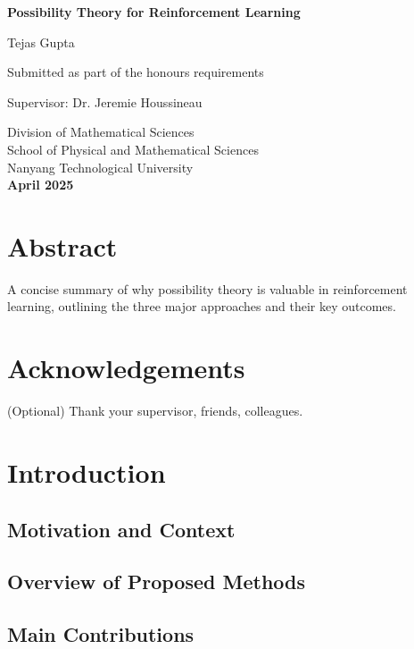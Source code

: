 \documentclass[14pt,a4paper]{report}
\begin{document}
\begin{titlepage}
    \centering
    \vspace*{3cm}
    {\Huge\bfseries Possibility Theory for Reinforcement Learning \par}
    \vspace{2cm}
    {\Large Tejas Gupta \par}
    \vspace{1.5cm}
    Submitted as part of the honours requirements \par
    \vspace{1cm}
    Supervisor: Dr. Jeremie Houssineau \par
    \vfill
    Division of Mathematical Sciences \\
    School of Physical and Mathematical Sciences \\
    Nanyang Technological University \\
    \vspace{1cm}
    \textbf{April 2025}
\end{titlepage}

\chapter*{Abstract}
A concise summary of why possibility theory is valuable in reinforcement learning, outlining the three major approaches and their key outcomes.

\chapter*{Acknowledgements}
(Optional) Thank your supervisor, friends, colleagues.

\tableofcontents

\chapter{Introduction}
\section{Motivation and Context}
\section{Overview of Proposed Methods}
\section{Main Contributions}
\end{document}
